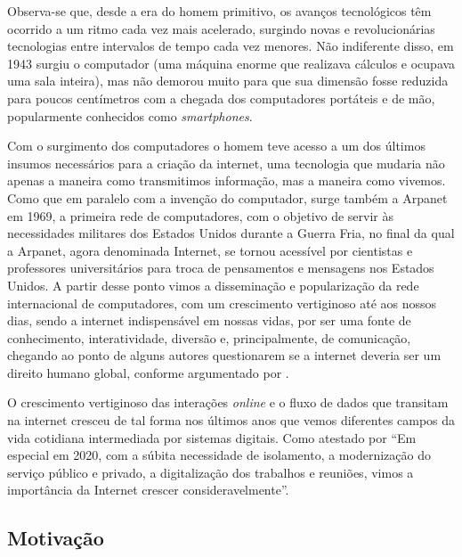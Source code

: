 Observa-se que, desde a era do homem primitivo, os avanços
tecnológicos têm ocorrido a um ritmo cada vez mais acelerado,
surgindo novas e revolucionárias tecnologias entre intervalos de
tempo cada vez menores. Não indiferente disso, em 1943 surgiu o
computador (uma máquina enorme que realizava cálculos e ocupava uma
sala inteira), mas não demorou muito para que sua dimensão fosse
reduzida para poucos centímetros com a chegada dos computadores portáteis
e de mão, popularmente conhecidos como \textit{smartphones}.

Com o surgimento dos computadores o homem teve acesso a um dos
últimos insumos necessários para a criação da internet, uma
tecnologia que mudaria não apenas a maneira como transmitimos
informação, mas a maneira como vivemos. Como que em paralelo com a
invenção do computador, surge também a Arpanet em 1969, a primeira
rede de computadores, com o objetivo de servir às necessidades
militares dos Estados Unidos durante a Guerra Fria, no final da qual a
Arpanet, agora denominada Internet, se tornou acessível por
cientistas e professores universitários para troca de pensamentos e
mensagens nos Estados Unidos. A partir desse ponto vimos a
disseminação e popularização da rede internacional de computadores,
com um crescimento vertiginoso até aos nossos dias, sendo a internet
indispensável em nossas vidas, por ser uma fonte de conhecimento,
interatividade, diversão e, principalmente, de comunicação, chegando
ao ponto de alguns autores questionarem se a internet deveria ser um
direito humano global, conforme argumentado por .

O crescimento vertiginoso das interações \textit{online} e o fluxo de dados
que transitam na internet cresceu de tal forma nos últimos anos que
vemos diferentes campos da vida cotidiana intermediada por sistemas
digitais. Como atestado por 
“Em especial em 2020, com a súbita necessidade de isolamento, a
modernização do serviço público e privado, a digitalização dos
trabalhos e reuniões, vimos a importância da Internet crescer
consideravelmente”.


\subsection{Motivação}

